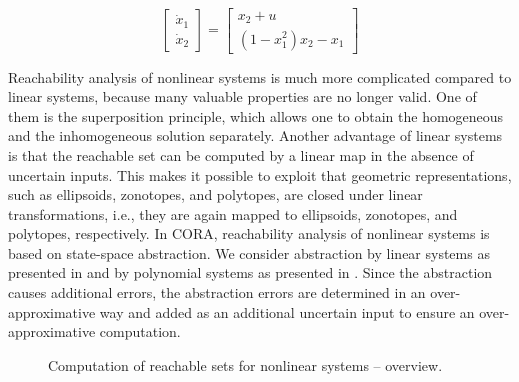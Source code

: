 \begin{center}
\begin{minipage}[t]{0.48\textwidth}
	\vspace{10pt}
	\begin{equation*}
	\begin{bmatrix} \dot x_1 \\ \dot x_2 \end{bmatrix} = \begin{bmatrix}  x_2 + u \\ (1-x_1^2)x_2 - x_1 \end{bmatrix}
\end{equation*}
\end{minipage}
\begin{minipage}[t]{0.48\textwidth}
	\footnotesize
	
\end{minipage}
\end{center}




\label{sec:nonlinearReach}

Reachability analysis of nonlinear systems is much more complicated compared to linear systems, because many valuable properties are no longer valid. One of them is the superposition principle, which allows one to obtain the homogeneous and the inhomogeneous solution separately. Another advantage of linear systems is that the reachable set can be computed by a linear map in the absence of uncertain inputs. This makes it possible to exploit that geometric representations, such as ellipsoids, zonotopes, and polytopes, are closed under linear transformations, i.e., they are again mapped to ellipsoids, zonotopes, and polytopes, respectively. In CORA, reachability analysis of nonlinear systems is based on state-space abstraction. We consider abstraction by linear systems as presented in \cite[Section 3.4]{Althoff2010a} and by polynomial systems as presented in \cite{Althoff2013a}. Since the abstraction causes additional errors, the abstraction errors are determined in an over-approximative way and added as an additional uncertain input to ensure an over-approximative computation.


\begin{figure}[ht!] 
	\centering
    \caption{Computation of reachable sets for nonlinear systems -- overview.}
    \label{fig:nonLinOverview}
\end{figure}

